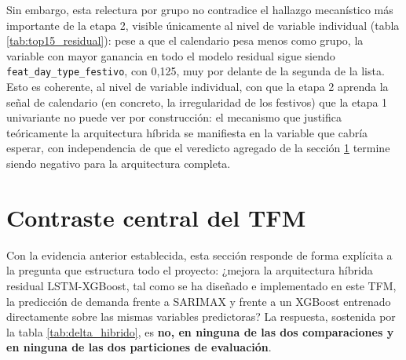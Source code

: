 Sin embargo, esta relectura por grupo no contradice el hallazgo mecanístico más
importante de la etapa 2, visible únicamente al nivel de variable individual (tabla
\ref{tab:top15_residual}): pese a que el calendario pesa menos como grupo, la variable con
mayor ganancia en todo el modelo residual sigue siendo \texttt{feat\_day\_type\_festivo},
con 0,125, muy por delante de la segunda de la lista. Esto es coherente, al nivel de
variable individual, con que la etapa 2 aprenda la señal de calendario (en concreto, la
irregularidad de los festivos) que la etapa 1 univariante no puede ver por construcción:
el mecanismo que justifica teóricamente la arquitectura híbrida se manifiesta en la
variable que cabría esperar, con independencia de que el veredicto agregado de la sección
\ref{sec:contraste_central} termine siendo negativo para la arquitectura completa.

\begin{table}[htbp]
  \centering
  \small
  
  \caption{}
  \label{tab:top15_residual}
\end{table}

\section{Contraste central del TFM}\label{sec:contraste_central}

Con la evidencia anterior establecida, esta sección responde de forma explícita a la
pregunta que estructura todo el proyecto: ¿mejora la arquitectura híbrida residual
LSTM-XGBoost, tal como se ha diseñado e implementado en este TFM, la predicción de demanda
frente a SARIMAX y frente a un XGBoost entrenado directamente sobre las mismas variables
predictoras? La respuesta, sostenida por la tabla \ref{tab:delta_hibrido}, es \textbf{no,
en ninguna de las dos comparaciones y en ninguna de las dos particiones de evaluación}.

\begin{table}[htbp]
  \centering
  
  \caption{}
  \label{tab:delta_hibrido}
\end{table}

